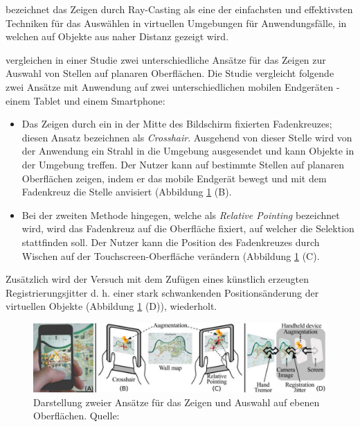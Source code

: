 \citeauthor{Bowman2011} bezeichnet das Zeigen durch Ray-Casting als eine der einfachsten und effektivsten Techniken für das Auswählen in virtuellen Umgebungen für Anwendungsfälle, in welchen auf Objekte aus 
naher Distanz gezeigt wird.\cite[S.~153]{Bowman2011}

\citeauthor{Vincent2013} vergleichen in einer Studie zwei unterschiedliche Ansätze für das Zeigen zur Auswahl von Stellen auf planaren Oberflächen. 
Die Studie vergleicht folgende zwei Ansätze mit Anwendung auf zwei unterschiedlichen mobilen Endgeräten - einem Tablet und einem Smartphone: 

\begin{itemize}
\item{Das Zeigen durch ein in der Mitte des Bildschirm fixierten Fadenkreuzes; diesen Ansatz bezeichnen \citeauthor{Vincent2013} als \textit{Crosshair}. Ausgehend von dieser Stelle wird von der Anwendung ein 
Strahl in die Umgebung ausgesendet und kann Objekte in der Umgebung treffen. Der Nutzer kann auf bestimmte Stellen auf planaren Oberflächen zeigen, indem er das mobile Endgerät bewegt und mit dem Fadenkreuz die Stelle anvisiert (Abbildung \ref{img:pointing_vergleich} (B).} 
\item{Bei der zweiten Methode hingegen, welche als \textit{Relative Pointing} bezeichnet wird, wird das Fadenkreuz auf die Oberfläche fixiert, auf welcher die Selektion stattfinden soll. Der Nutzer kann die Position des Fadenkreuzes durch Wischen auf der 
	Touchscreen-Oberfläche verändern (Abbildung \ref{img:pointing_vergleich} (C).}
\end{itemize}

Zusätzlich wird der Versuch mit dem Zufügen eines künstlich erzeugten Registrierungsjitter d. h. einer stark schwankenden Positionsänderung der virtuellen Objekte (Abbildung \ref{img:pointing_vergleich} (D)), wiederholt. 

\begin{figure}[H]
	\centering
	\includegraphics[width=.7\textwidth]{resources/analyse/Pointing_techniken.png}
	\caption{Darstellung zweier Ansätze für das Zeigen und Auswahl auf ebenen Oberflächen. Quelle: \cite{Vincent2013}}
	\label{img:pointing_vergleich}
\end{figure}

